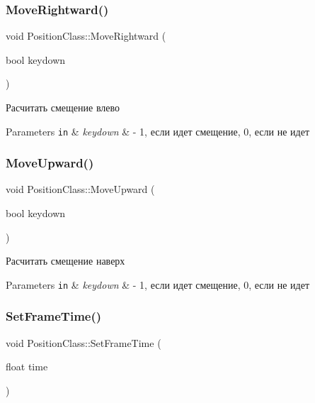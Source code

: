 \subsubsection{\texorpdfstring{Move\+Rightward()}{MoveRightward()}}
{\footnotesize\ttfamily void Position\+Class\+::\+Move\+Rightward (\begin{DoxyParamCaption}\item[{bool}]{keydown }\end{DoxyParamCaption})}



Расчитать смещение влево 


\begin{DoxyParams}[1]{Parameters}
\mbox{\tt in}  & {\em keydown} & -\/ 1, если идет смещение, 0, если не идет \\
\hline
\end{DoxyParams}
\mbox{\label{class_position_class_a1f52e86807015fe0be8216a954e763cd}} 
\subsubsection{\texorpdfstring{Move\+Upward()}{MoveUpward()}}
{\footnotesize\ttfamily void Position\+Class\+::\+Move\+Upward (\begin{DoxyParamCaption}\item[{bool}]{keydown }\end{DoxyParamCaption})}



Расчитать смещение наверх 


\begin{DoxyParams}[1]{Parameters}
\mbox{\tt in}  & {\em keydown} & -\/ 1, если идет смещение, 0, если не идет \\
\hline
\end{DoxyParams}
\mbox{\label{class_position_class_a110e6895159c6e5335f1afaa27e7f0c8}} 
\subsubsection{\texorpdfstring{Set\+Frame\+Time()}{SetFrameTime()}}
{\footnotesize\ttfamily void Position\+Class\+::\+Set\+Frame\+Time (\begin{DoxyParamCaption}\item[{float}]{time }\end{DoxyParamCaption})}



